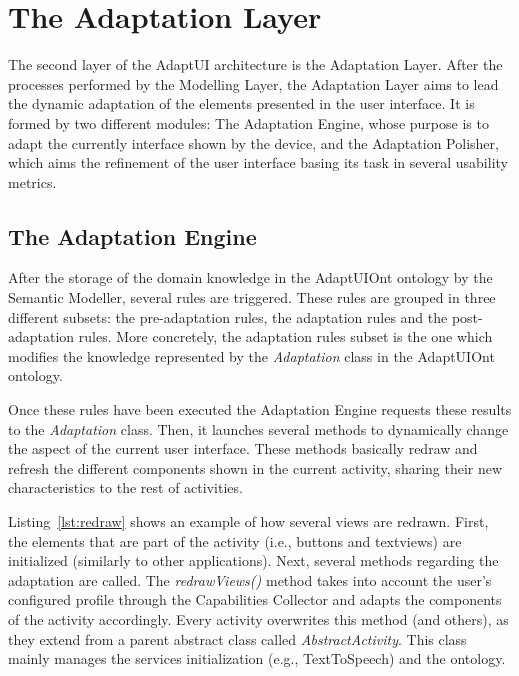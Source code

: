 \section{The Adaptation Layer}
\label{sec:adaptation_layer}

The second layer of the AdaptUI architecture is the Adaptation Layer. After the
processes performed by the Modelling Layer, the Adaptation Layer aims to lead the
dynamic adaptation of the elements presented in the user interface. It is formed
by two different modules: The Adaptation Engine, whose purpose is to adapt the
currently interface shown by the device, and the Adaptation Polisher, which aims
the refinement of the user interface basing its task in several usability metrics.


\subsection{The Adaptation Engine}
\label{sec:adaptation_engine}

After the storage of the domain knowledge in the AdaptUIOnt ontology by the
Semantic Modeller, several rules are triggered. These rules are grouped in three
different subsets: the pre-adaptation rules, the adaptation rules and the post-adaptation
rules. More concretely, the adaptation rules subset is the one which modifies
the knowledge represented by the \textit{Adaptation} class in the AdaptUIOnt
ontology.

Once these rules have been executed the Adaptation Engine requests these results
to the \textit{Adaptation} class. Then, it launches several methods to dynamically
change the aspect of the current user interface. These methods basically redraw
and refresh the different components shown in the current activity, sharing
their new characteristics to the rest of activities. 

Listing~\ref{lst:redraw} shows an example of how several views are redrawn.
First, the elements that are part of the activity (i.e., buttons and textviews)
are initialized (similarly to other applications). Next, several methods regarding
the adaptation are called. The \textit{redrawViews()} method takes into account
the user's configured profile through the Capabilities Collector and adapts the
components of the activity accordingly. Every activity overwrites this method
(and others), as they extend from a parent abstract class called
\textit{AbstractActivity}. This class mainly manages the services initialization
(e.g., TextToSpeech) and the ontology. 


